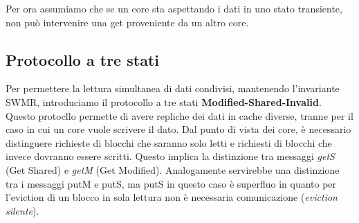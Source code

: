\begin{warn}
    Per ora assumiamo che se un core sta aspettando i dati in uno stato transiente, non può intervenire una get proveniente da un altro core. 
\end{warn}

\begin{figure}[ht]
    \centering
    \setlength{\fboxrule}{0.5pt} %
    \setlength{\fboxsep}{0pt}    %
\end{figure}

\subsection{Protocollo a tre stati}
Per permettere la lettura simultanea di dati condivisi, mantenendo l'invariante SWMR, introduciamo il protocollo a tre stati \textbf{Modified-Shared-Invalid}. Questo protocllo permette di avere repliche dei dati in cache diverse, tranne per il caso in cui un core vuole scrivere il dato. Dal punto di vista dei core, è necessario distinguere richieste di blocchi che saranno solo letti e richiesti di blocchi che invece dovranno essere scritti. Questo implica la distinzione tra messaggi \textit{getS} (Get Shared) e \textit{getM} (Get Modified). Analogamente servirebbe una distinzione tra i messaggi putM e putS, ma putS in questo caso è superfluo in quanto per l'eviction di un blocco in sola lettura non è necessaria comunicazione (\textit{eviction silente}).

\begin{figure}[ht]
    \centering
    \setlength{\fboxrule}{0.5pt} %
    \setlength{\fboxsep}{0pt}    %
\end{figure}


